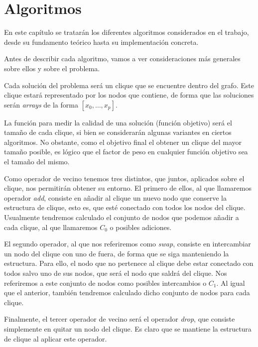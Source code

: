 \chapter{Algoritmos}\label{ch:algoritmos}

En este capítulo se tratarán los diferentes algoritmos considerados en el trabajo, desde su
fundamento teórico hasta su implementación concreta.

Antes de describir cada algoritmo, vamos a ver consideraciones más generales sobre ellos y sobre el problema.

Cada solución del problema será un clique que se encuentre dentro del grafo. Este clique estará representado
por los nodos que contiene, de forma que las soluciones serán \textit{arrays} de la forma $[x_0, \dots, x_p]$.

La función para medir la calidad de una solución (función objetivo) será el tamaño de cada clique, si bien
se considerarán algunas variantes en ciertos algoritmos. No obstante, como el objetivo final el obtener un clique
del mayor tamaño posible, es lógico que el factor de peso en cualquier función objetivo sea el tamaño del mismo.

Como operador de vecino tenemos tres distintos, que juntos, aplicados sobre el clique, nos permitirán obtener
su entorno. El primero de ellos, al que llamaremos operador \textit{add}, consiste en añadir al clique un
nuevo nodo que conserve la estructura de clique, esto es, que esté conectado con todos los nodos del clique.
Usualmente tendremos calculado el conjunto de nodos que podemos añadir a cada clique, al que llamaremos $C_0$ o
posibles adiciones.

El segundo operador, al que nos referiremos como \textit{swap}, consiste en intercambiar un nodo del clique con uno de
fuera, de forma que se siga manteniendo la estructura. Para ello, el nodo que no pertenece al clique debe estar
conectado con todos salvo uno de sus nodos, que será el nodo que saldrá del clique. Nos referiremos a
este conjunto de nodos como posibles intercambios o $C_1$. Al igual que el anterior, también tendremos calculado
dicho conjunto de nodos para cada clique.

Finalmente, el tercer operador de vecino será el operador \textit{drop}, que consiste simplemente en quitar un nodo
del clique. Es claro que se mantiene la estructura de clique al aplicar este operador.

